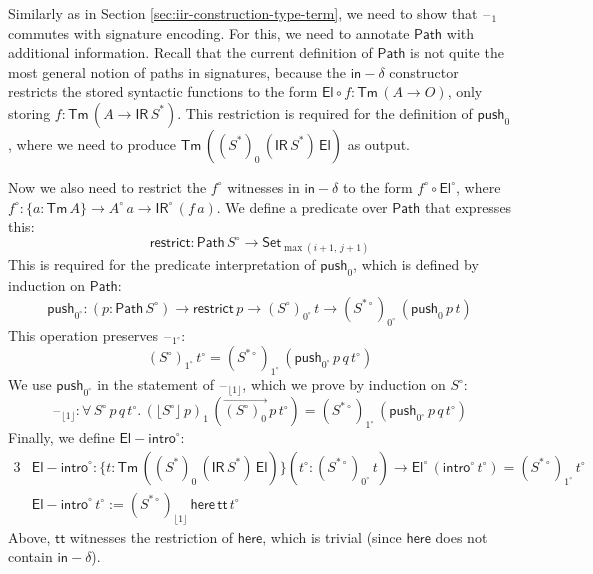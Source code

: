 \documentclass[acmsmall,screen,review,anonymous]{acmart}
\newcommand{\msf}[1]{{\mathsf{#1}}}
\newcommand{\push}{\mathsf{push}}
\newcommand{\Set}{\msf{Set}}
\newcommand{\El}{\msf{El}}
\newcommand{\ttt}{\msf{tt}}
\newcommand{\blank}{{\mathord{\hspace{1pt}\text{--}\hspace{1pt}}}}
\newcommand{\IR}{\msf{IR}}
\newcommand{\intro}{\msf{intro}}
\newcommand{\floord}[1]{\lfloor #1 \rfloor}
\newcommand{\ora}[1]{\overrightarrow{#1}}
\newcommand{\Tm}{\msf{Tm}}
\newcommand{\w}{\circ}
\newcommand{\Path}{\msf{Path}}
\newcommand{\here}{\msf{here}}
\newcommand{\Ssw}{S^{*\w}}
\newcommand{\indelta}{\msf{in}\!\!-\!\!\delta}
\newcommand{\Elintro}{\msf{El\!\!-\!\!intro}}
\begin{document}
\begin{definition}[Interpretation of $\Elintro$]\label{sec:canonicity-elintro}
Similarly as in Section \ref{sec:iir-construction-type-term}, we need to show that $\blank_1$ commutes with signature
encoding. For this, we need to annotate $\Path$ with additional information. Recall that the
current definition of $\Path$ is not quite the most general notion of paths in signatures,
because the $\indelta$ constructor restricts the stored syntactic functions to the form $\El \circ f
: \Tm\,(A \to O)$, only storing $f : \Tm\,(A \to \IR\,S^*)$. This restriction is required for the
definition of $\push_0$, where we need to produce $\Tm\,((S^*)_0\,(\IR\,S^*)\,\El)$ as output.

Now we also need to restrict the $f^\w$ witnesses in $\indelta$ to the form $f^\w \circ \El^\w$,
where $f^\w : \{a : \Tm\,A\} \to A^\w\,a \to \IR^\w\,(f\,a)$. We define a predicate over $\Path$
that expresses this:
\[ \msf{restrict} : \Path\,S^\w \to \Set_{\max(i+1,\,j+1)} \]
This is required for the predicate interpretation of $\push_0$, which is defined by induction on $\Path$:
\[ \push_{0^\w} : (p : \Path\,S^\w) \to \msf{restrict}\,p \to (S^\w)_{0^\w}\,t \to (\Ssw)_{0^\w}\,(\push_0\,p\,t) \]
This operation preserves $\blank_{1^\w}$:
\[ (S^\w)_{1^\w}\,t^\w = (\Ssw)_{1^\w}\,(\push_{0^\w}\,p\,q\,t^\w)  \]
We use $\push_{0^\w}$ in the statement of $\blank_{\floord{1}}$, which we prove by induction on
$S^\w$:
\[ \blank_{\floord{1}} : \forall\,S^\w\,p\,q\,t^\w.\,(\floord{S^\w}\,p)_1\,(\ora{(S^\w)_0}\,p\,t^\w) = (\Ssw)_{1^\w}\,(\push_{0^\w}\,p\,q\,t^\w) \]
Finally, we define $\Elintro^\w$:
\begin{alignat*}{3}
    &\Elintro^\w : \{t : \Tm\,((S^*)_0\,(\IR\,S^*)\,\El)\}(t^\w : (\Ssw)_{0^\w}\,t) \to \El^\w\,(\intro^\w\,t^\w) = (\Ssw)_{1^\w}\,t^\w\\
    &\Elintro^\w\,t^\w := (\Ssw)_{\floord{1}}\,\here\,\ttt\,t^\w
\end{alignat*}
Above, $\ttt$ witnesses the restriction of $\here$, which is trivial (since $\here$ does not contain $\indelta$).
\end{definition}
\end{document}
